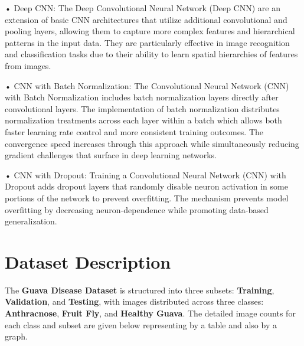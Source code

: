 \documentclass[conference]{IEEEtran}
\begin{document}
• Deep CNN: The Deep Convolutional Neural Network (Deep CNN) are an extension of basic CNN architectures that utilize additional convolutional and pooling layers, allowing them to capture more complex features and hierarchical patterns in the input data. They are particularly effective in image recognition and classification tasks due to their ability to learn spatial hierarchies of features from images.

• CNN with Batch Normalization: The Convolutional Neural Network (CNN) with Batch Normalization includes batch normalization layers directly after convolutional layers. The implementation of batch normalization distributes normalization treatments across each layer within a batch which allows both faster learning rate control and more consistent training outcomes. The convergence speed increases through this approach while simultaneously reducing gradient challenges that surface in deep learning networks.

• CNN with Dropout: Training a Convolutional Neural Network (CNN) with Dropout adds dropout layers that randomly disable neuron activation in some portions of the network to prevent overfitting. The mechanism prevents model overfitting by decreasing neuron-dependence while promoting data-based generalization.

\section{Dataset Description}

The \textbf{Guava Disease Dataset} is structured into three subsets: \textbf{Training}, \textbf{Validation}, and \textbf{Testing}, with images distributed across three classes: \textbf{Anthracnose}, \textbf{Fruit Fly}, and \textbf{Healthy Guava}. The detailed image counts for each class and subset are given below representing by a table and also by a graph.
\begin{table}[h!]
    \centering
    \caption{Image Counts in Each Dataset Split}
    \label{tab:dataset_distribution}
\end{table}
\end{document}
